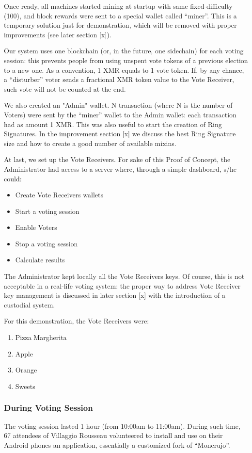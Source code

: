 \documentclass[10pt, letterpaper]{article}
\begin{document}
Once ready, all machines started mining at startup with same fixed-difficulty (100), and block rewards were sent to a special wallet called “miner”. This is a temporary solution just for demonstration, which will be removed with proper improvements (see later section [x]).
\bigskip

Our system uses one blockchain (or, in the future, one sidechain) for each voting session: this prevents people from using unspent vote tokens of a previous election to a new one. As a convention, 1 XMR equals to 1 vote token. If, by any chance, a “disturber” voter sends a fractional XMR token value to the Vote Receiver, such vote will not be counted at the end.
\bigskip

We also created an "Admin" wallet. N transaction (where N is the number of Voters) were sent by the “miner” wallet to the Admin wallet: each transaction had as amount 1 XMR. This was also useful to start the creation of Ring Signatures. In the improvement section [x] we discuss the best Ring Signature size and how to create a good number of available mixins.
\bigskip

At last, we set up the Vote Receivers. For sake of this Proof of Concept, the Administrator had access to a server where, through a simple dashboard, s/he could:
\begin{itemize}
\item Create Vote Receivers wallets
\item Start a voting session
\item Enable Voters
\item Stop a voting session
\item Calculate results
\end{itemize}
The Administrator kept locally all the Vote Receivers keys. Of course, this is not acceptable in a real-life voting system: the proper way to address Vote Receiver key management is discussed in later section [x] with the introduction of a custodial system.
\bigskip

For this demonstration, the Vote Receivers were: 
\begin{enumerate}
\item Pizza Margherita
\item Apple
\item Orange
\item Sweets
\end{enumerate}

\subsubsection{During Voting Session}
The voting session lasted 1 hour (from 10:00am to 11:00am). During such time, 67 attendees of Villaggio Rousseau volunteered to install and use on their Android phones an application, essentially a customized fork of “Monerujo”. 
\bigskip
\end{document}
